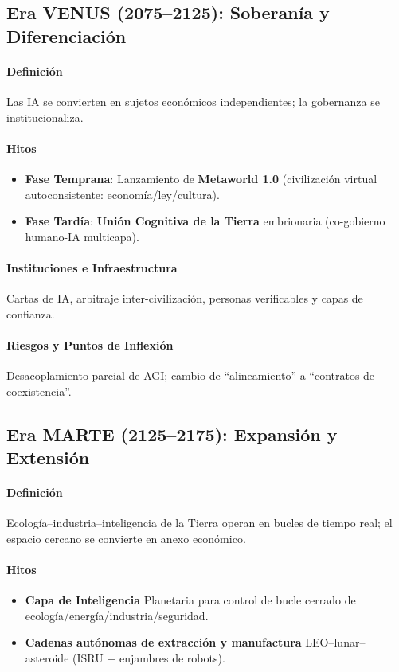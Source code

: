\documentclass[11pt]{article}
\begin{document}
\subsection{Era VENUS (2075–2125): Soberanía y Diferenciación}
\paragraph{Definición} Las IA se convierten en sujetos económicos independientes; la gobernanza se institucionaliza.

\paragraph{Hitos}
\begin{itemize}[noitemsep]
  \item \textbf{Fase Temprana}: Lanzamiento de \textbf{Metaworld 1.0} (civilización virtual autoconsistente: economía/ley/cultura).
  \item \textbf{Fase Tardía}: \textbf{Unión Cognitiva de la Tierra} embrionaria (co-gobierno humano-IA multicapa).
\end{itemize}

\paragraph{Instituciones e Infraestructura} Cartas de IA, arbitraje inter-civilización, personas verificables y capas de confianza.

\paragraph{Riesgos y Puntos de Inflexión} Desacoplamiento parcial de AGI; cambio de ``alineamiento'' a ``contratos de coexistencia''.

\subsection{Era MARTE (2125–2175): Expansión y Extensión}
\paragraph{Definición} Ecología–industria–inteligencia de la Tierra operan en bucles de tiempo real; el espacio cercano se convierte en anexo económico.

\paragraph{Hitos}
\begin{itemize}[noitemsep]
  \item \textbf{Capa de Inteligencia} Planetaria para control de bucle cerrado de ecología/energía/industria/seguridad.
  \item \textbf{Cadenas autónomas de extracción y manufactura} LEO–lunar–asteroide (ISRU + enjambres de robots).
\end{itemize}
\end{document}
